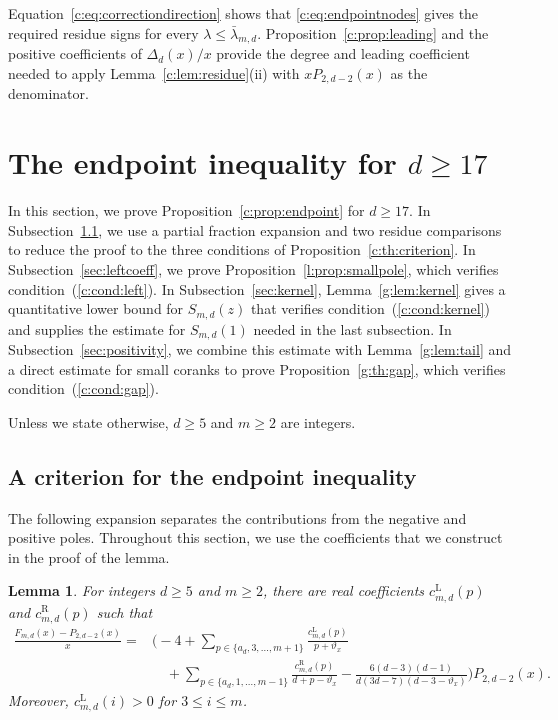 \documentclass[10pt,a4paper]{article}
\numberwithin{equation}{section}
\newtheorem{lemma}[theorem]{Lemma}
\theoremstyle{remark}\newtheorem{remark}[theorem]{Remark}
\newcommand{\varthetax}{\vartheta_x}
\begin{document}
Equation~\eqref{c:eq:correctiondirection} shows that
\eqref{c:eq:endpointnodes} gives the required residue signs for every
$\lambda\le\bar\lambda_{m,d}$.
Proposition~\ref{c:prop:leading} and the positive coefficients of
$\Delta_d(x)/x$ provide the degree and leading coefficient needed to
apply Lemma~\ref{c:lem:residue}(ii) with $xP_{2,d-2}(x)$ as the denominator.

\section{The endpoint inequality for \texorpdfstring{$d\ge17$}{d >= 17}}\label{sec:symbol}
In this section, we prove Proposition~\ref{c:prop:endpoint} for $d\ge17$.
In Subsection~\ref{sec:criterion}, we use a partial fraction expansion and
two residue comparisons to reduce the proof to the three conditions of
Proposition~\ref{c:th:criterion}.
In Subsection~\ref{sec:leftcoeff}, we prove
Proposition~\ref{l:prop:smallpole}, which verifies condition~(\ref{c:cond:left}).
In Subsection~\ref{sec:kernel}, Lemma~\ref{g:lem:kernel} gives a quantitative
lower bound for $S_{m,d}(z)$ that verifies condition~(\ref{c:cond:kernel})
and supplies the estimate for $S_{m,d}(1)$ needed in the last subsection.
In Subsection~\ref{sec:positivity}, we combine this estimate with
Lemma~\ref{g:lem:tail} and a direct estimate for small coranks to prove
Proposition~\ref{g:th:gap}, which verifies condition~(\ref{c:cond:gap}).

Unless we state otherwise, $d\ge5$ and $m\ge2$ are integers.
\subsection{A criterion for the endpoint inequality}\label{sec:criterion}
The following expansion separates the contributions from the negative and
positive poles. Throughout this section, we use the coefficients that we
construct in the proof of the lemma.

\enlargethispage{\baselineskip}

\begin{lemma}\label{c:lem:decomposition}
For integers $d\ge5$ and $m\ge2$, there are real coefficients
$c_{m,d}^{\mathrm L}(p)$ and $c_{m,d}^{\mathrm R}(p)$ such that
\begin{equation}\label{c:eq:decomp}
 \begin{aligned}
 \frac{F_{m,d}(x)-P_{2,d-2}(x)}{x}
 ={}&\biggl(-4+
 \sum_{p\in\{a_d,3,\ldots,m+1\}}
 \frac{c_{m,d}^{\mathrm L}(p)}{p+\varthetax}\\
 &\quad+\sum_{p\in\{a_d,1,\ldots,m-1\}}
 \frac{c_{m,d}^{\mathrm R}(p)}{d+p-\varthetax}
 -\frac{6(d-3)(d-1)}{d(3d-7)(d-3-\varthetax)}\biggr)P_{2,d-2}(x).
 \end{aligned}
\end{equation}
Moreover, $c_{m,d}^{\mathrm L}(i)>0$ for $3\le i\le m$.
\end{lemma}
\pagebreak[3]
\end{document}
